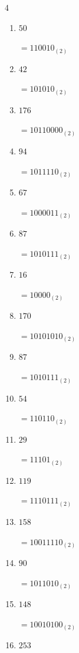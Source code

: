 \begin{multicols}{4}
\begin{enumerate}
        $=11001011_{(2)}$

  \item $50$

        $=110010_{(2)}$

  \item $42$

        $=101010_{(2)}$

  \item $176$

        $=10110000_{(2)}$

  \item $94$

        $=1011110_{(2)}$

  \item $67$

        $=1000011_{(2)}$

\columnbreak %

\resetques

  \item $87$

        $=1010111_{(2)}$

  \item $16$

        $=10000_{(2)}$

  \item $170$

        $=10101010_{(2)}$

  \item $87$

        $=1010111_{(2)}$

  \item $54$

        $=110110_{(2)}$

  \item $29$

        $=11101_{(2)}$

  \item $119$

        $=1110111_{(2)}$

  \item $158$

        $=10011110_{(2)}$

  \item $90$

        $=1011010_{(2)}$

  \item $148$

        $=10010100_{(2)}$

  \item $253$


\end{enumerate}
\end{multicols}
